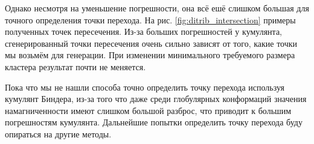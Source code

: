 Однако несмотря на уменьшение погрешности, она всё ешё слишком большая для точного определения точки перехода. На рис. \ref*{fig:ditrib_intersection} примеры полученных точек пересечения. Из-за больших погрешностей у кумулянта, сгенерированный точки пересечения очень сильно зависят от того, какие точки мы возьмём для генерации. При изменении минимального требуемого размера кластера результат почти не меняется. 

Пока что мы не нашли способа точно определить точку перехода используя кумулянт Биндера, из-за того что даже среди глобулярных конформаций значения намагниченности имеют слишком большой разброс, что приводит к большим погрешностям кумулянта. Дальнейшие попытки определить точку перехода буду опираться на другие методы.